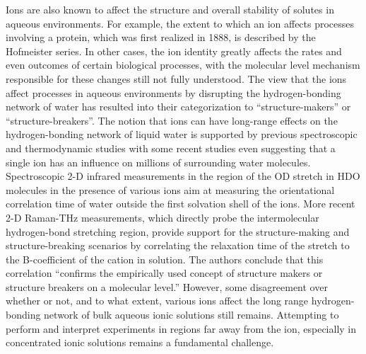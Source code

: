 \documentclass[11pt, proquest]{uwthesis}[2020/02/24]
\begin{document}
\par Ions are also known to affect the structure and overall stability of solutes in aqueous environments. For example, the extent to which an ion affects processes involving a protein, which was first realized in 1888,\autocite{hofmeister_zur_1888} is described by the Hofmeister series. In other cases, the ion identity greatly affects the rates and even outcomes of certain biological processes,\autocite{zhang_interactions_2006} with the molecular level mechanism responsible for these changes still not fully understood. The view that the ions affect processes in aqueous environments by disrupting the hydrogen-bonding network of water\autocite{marcus_effect_2009} has resulted into their categorization to “structure-makers” or “structure-breakers”.\autocite{collins_hofmeister_1985} The notion that ions can have long-range effects on the hydrogen-bonding network of liquid water is supported by previous spectroscopic\autocite{omta_influence_2003,omta_negligible_2003,kropman_vibrational_2003,kropman_effect_2004} and thermodynamic\autocite{batchelor_impact_2004} studies with some recent studies even suggesting that a single ion has an influence on millions of surrounding water molecules.\autocite{chen_electrolytes_2016} Spectroscopic 2-D infrared measurements in the region of the OD stretch in HDO molecules in the presence of various ions aim at measuring the orientational correlation time of water outside the first solvation shell of the ions. More recent 2-D Raman-THz measurements, which directly probe the intermolecular hydrogen-bond stretching region, provide support for the structure-making and structure-breaking scenarios by correlating the relaxation time of the stretch to the B-coefficient of the cation in solution.\autocite{shalit_terahertz_2017} The authors conclude that this correlation “confirms the empirically used concept of structure makers or structure breakers on a molecular level.”\autocite{shalit_terahertz_2017} However, some disagreement over whether or not, and to what extent, various ions affect the long range hydrogen-bonding network of bulk aqueous ionic solutions still remains. Attempting to perform and interpret experiments in regions far away from the ion, especially in concentrated ionic solutions remains a fundamental challenge.
\end{document}
